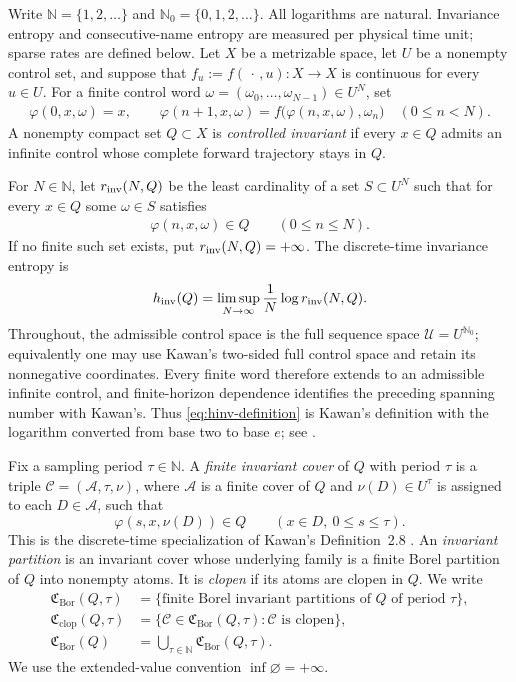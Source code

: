 \documentclass[11pt,reqno]{amsart}
\numberwithin{equation}{section}
\theoremstyle{definition}
\newcommand{\N}{\mathbb N}
\newcommand{\Nzero}{\mathbb N_0}
\newcommand{\C}{\mathcal C}
\newcommand{\Acal}{\mathcal A}
\newcommand{\hinv}{h_{\mathrm{inv}}}
\newcommand{\Bor}{\mathrm{Bor}}
\newcommand{\clop}{\mathrm{clop}}
\begin{document}
Write $\N=\{1,2,\ldots\}$ and $\Nzero=\{0,1,2,\ldots\}$.
All logarithms are natural. Invariance entropy and consecutive-name entropy
are measured per physical time unit; sparse rates are defined below.
Let $X$ be a
metrizable space, let $U$ be a nonempty control set, and suppose that
$f_u:=f(\,\cdot\,,u):X\to X$ is continuous for every $u\in U$.  For a finite
control word $\omega=(\omega_0,\ldots,\omega_{N-1})\in U^N$, set
\begin{align*}
 \varphi(0,x,\omega)=x,
 \qquad
 \varphi(n+1,x,\omega)
 =f\bigl(\varphi(n,x,\omega),\omega_n\bigr)
 \quad(0\le n<N).
\end{align*}
A nonempty compact set $Q\subset X$ is \emph{controlled invariant} if every
$x\in Q$ admits an infinite control whose complete forward trajectory stays in
$Q$.

For $N\in\N$, let $r_{\rm inv}(N,Q)$ be the least cardinality of a set
$S\subset U^N$ such that for every $x\in Q$ some $\omega\in S$ satisfies
\begin{align*}
 \varphi(n,x,\omega)\in Q\qquad(0\le n\le N).
\end{align*}
If no finite such set exists, put $r_{\rm inv}(N,Q)=+\infty$.  The
discrete-time invariance entropy is
\begin{equation}\label{eq:hinv-definition}
 \hinv(Q)=\limsup_{N\to\infty}\frac1N\log r_{\rm inv}(N,Q).
\end{equation}
Throughout, the admissible control space is the full sequence space
$\mathcal U=U^{\Nzero}$; equivalently one may use Kawan's two-sided full
control space and retain its nonnegative coordinates.  Every finite word
therefore extends to an admissible infinite control, and finite-horizon
dependence identifies the preceding spanning number with Kawan's.  Thus
\eqref{eq:hinv-definition} is Kawan's definition with the logarithm converted
from base two to base $e$; see \cite[Definition~2.2, p.~44]{Kawan2013}.

Fix a sampling period $\tau\in\N$.  A \emph{finite invariant cover} of $Q$
with period $\tau$ is a triple $\C=(\Acal,\tau,\nu)$, where $\Acal$ is a finite
cover of $Q$ and $\nu(D)\in U^\tau$ is assigned to each $D\in\Acal$, such that
\begin{equation}\label{eq:invariant-cover}
 \varphi(s,x,\nu(D))\in Q
 \qquad(x\in D,\ 0\le s\le\tau).
\end{equation}
This is the discrete-time specialization of Kawan's Definition~2.8
\cite[p.~79]{Kawan2013}.  An \emph{invariant partition} is an invariant cover
whose underlying family is a finite Borel partition of $Q$ into nonempty
atoms.  It is \emph{clopen} if its atoms are clopen in $Q$.  We write
\begin{align*}
 \mathfrak C_{\Bor}(Q,\tau)&=\bigl\{\text{finite Borel invariant partitions of
 }Q\text{ of period }\tau\bigr\},\\
 \mathfrak C_{\clop}(Q,\tau)&=\bigl\{\C\in\mathfrak C_{\Bor}(Q,\tau):
 \C\text{ is clopen}\bigr\},\\
 \mathfrak C_{\Bor}(Q)&=\bigcup_{\tau\in\N}\mathfrak C_{\Bor}(Q,\tau).
\end{align*}
We use the extended-value convention $\inf\varnothing=+\infty$.
\end{document}
